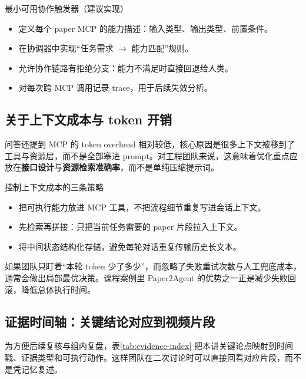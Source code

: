 \documentclass[a4paper]{article}
\begin{document}
\begin{knowledgebox}{最小可用协作触发器（建议实现）}
\begin{itemize}
    \item 定义每个 paper MCP 的能力描述：输入类型、输出类型、前置条件。
    \item 在协调器中实现``任务需求 $\rightarrow$ 能力匹配''规则。
    \item 允许协作链路有拒绝分支：能力不满足时直接回退给人类。
    \item 对每次跨 MCP 调用记录 trace，用于后续失效分析。
\end{itemize}
\end{knowledgebox}

\subsection{关于上下文成本与 token 开销}

问答还提到 MCP 的 token overhead 相对较低，核心原因是很多上下文被移到了工具与资源层，而不是全部塞进 prompt。对工程团队来说，这意味着优化重点应放在\textbf{接口设计}与\textbf{资源检索准确率}，而不是单纯压缩提示词。

\begin{importantbox}{控制上下文成本的三条策略}
\begin{itemize}
    \item 把可执行能力放进 MCP 工具，不把流程细节重复写进会话上下文。
    \item 先检索再拼接：只把当前任务需要的 paper 片段拉入上下文。
    \item 将中间状态结构化存储，避免每轮对话重复传输历史长文本。
\end{itemize}
\end{importantbox}

如果团队只盯着``本轮 token 少了多少''，而忽略了失败重试次数与人工兜底成本，通常会做出局部最优决策。课程案例里 Paper2Agent 的优势之一正是减少失败回滚，降低总体执行时间。

\subsection{证据时间轴：关键结论对应到视频片段}

为方便后续复核与组内复盘，表\ref{tab:evidence-index} 把本讲关键论点映射到时间戳、证据类型和可执行动作。这样团队在二次讨论时可以直接回看对应片段，而不是凭记忆复述。
\end{document}
